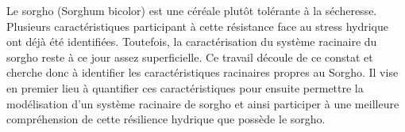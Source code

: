 Le sorgho (Sorghum bicolor) est une céréale plutôt tolérante à la sécheresse.
Plusieurs caractéristiques participant à cette résistance face au stress hydrique ont déjà été identifiées.
Toutefois, la caractérisation du système racinaire du sorgho reste à ce jour assez superficielle.
Ce travail découle de ce constat et cherche donc à identifier les caractéristiques racinaires propres au Sorgho.
Il vise en premier lieu à quantifier ces caractéristiques pour ensuite permettre la modélisation d'un système racinaire de sorgho et ainsi participer à une meilleure compréhension de cette résilience hydrique que possède le sorgho.